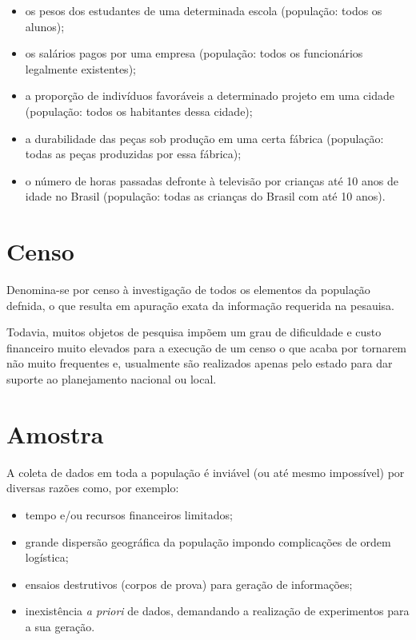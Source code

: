 \documentclass[
]{book}
\providecommand{\tightlist}{%
  \setlength{\itemsep}{0pt}\setlength{\parskip}{0pt}}
\begin{document}
\hfill\break

\begin{itemize}
\tightlist
\item
  os pesos dos estudantes de uma determinada escola (população: todos os alunos);\\
\item
  os salários pagos por uma empresa (população: todos os funcionários legalmente existentes);\\
\item
  a proporção de indivíduos favoráveis a determinado projeto em uma cidade (população: todos os habitantes dessa cidade);\\
\item
  a durabilidade das peças sob produção em uma certa fábrica (população: todas as peças produzidas por essa fábrica);
\item
  o número de horas passadas defronte à televisão por crianças até 10 anos de idade no Brasil (população: todas as crianças do Brasil com até 10 anos).
\end{itemize}

\hfill\break

\hypertarget{censo}{%
\section{Censo}\label{censo}}

\hfill\break

Denomina-se por censo à investigação de todos os elementos da população defnida, o que resulta em apuração exata da informação requerida na pesauisa.

\hfill\break

Todavia, muitos objetos de pesquisa impõem um grau de dificuldade e custo financeiro muito elevados para a execução de um censo o que acaba por tornarem não muito frequentes e, usualmente são realizados apenas pelo estado para dar suporte ao planejamento nacional ou local.

\hypertarget{amostra}{%
\section{Amostra}\label{amostra}}

\hfill\break

A coleta de dados em toda a população é inviável (ou até mesmo impossível) por diversas razões como, por exemplo:

\hfill\break

\begin{itemize}
\tightlist
\item
  tempo e/ou recursos financeiros limitados;\\
\item
  grande dispersão geográfica da população impondo complicações de ordem logística;\\
\item
  ensaios destrutivos (corpos de prova) para geração de informações;\\
\item
  inexistência \emph{a priori} de dados, demandando a realização de experimentos para a sua geração.
\end{itemize}
\end{document}
